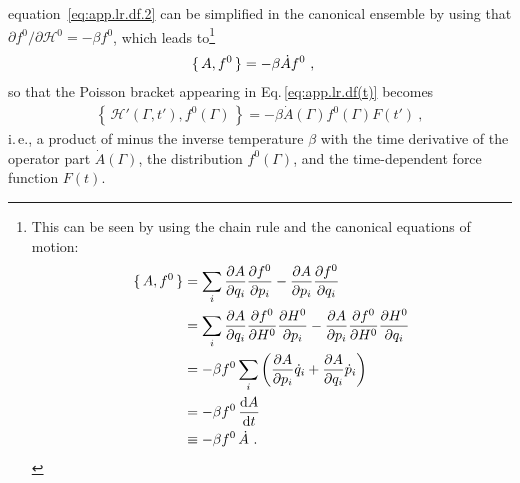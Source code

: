 equation~\eqref{eq:app.lr.df.2} can be simplified in the canonical ensemble by using that \mbox{$\partial f^0 / \partial \mathcal H^0 = -\beta f^0$}, which leads to\footnote{This can be seen by using the chain rule and the canonical equations of motion:	
\begin{align*}
	\set{A, f^0}
	&= \sum_i \frac{\partial A}{\partial q_i} \frac{\partial f^0}{\partial p_i}
	- \frac{\partial A}{\partial p_i} \frac{\partial f^0}{\partial q_i} \\
	&= \sum_i \frac{\partial A}{\partial q_i} \frac{\partial f^0}{\partial H^0} \frac{\partial H^0}{\partial p_i}
	- \frac{\partial A}{\partial p_i} \frac{\partial f^0}{\partial H^0} \frac{\partial H^0}{\partial q_i} \\
	&= -\beta f^0 \sum_i
	\left( \frac{\partial A}{\partial p_i} \dot{q}_i +  \frac{\partial A}{\partial q_i} \dot{p}_i \right) \\
	&= -\beta f^0 \, \frac{{\rm d} A}{{\rm d} t} \\
	&\equiv -\beta f^0 \, \dot A~.
	\end{align*}}
\begin{align}
  \set{A, f^0}
    &= -\beta \dot A f^0~,
   \label{eq:app.lr.dA_dt}
\end{align}
so that the Poisson bracket %
appearing in Eq.\,\eqref{eq:app.lr.df(t)} becomes
\begin{align}
	\left\{\, \mathcal  H' (\Gamma, t'), f^0 (\Gamma) \,\right\}
		= - \beta \dot{A} (\Gamma) f^0 (\Gamma) F(t')~,
	\label{eq:app.lr.poisson.H'}
\end{align}
i.\,e., a product of minus the inverse temperature $\beta$ with the time derivative of the operator part $\dot A (\Gamma)$, the distribution $f^0 (\Gamma)$, and the time-dependent force function $F (t)$.

